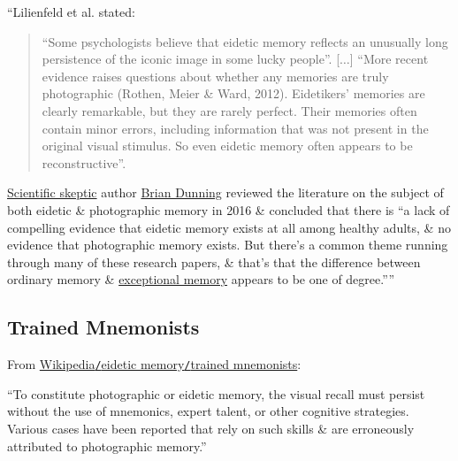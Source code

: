 \documentclass[oneside]{book}
\numberwithin{equation}{section}
\begin{document}
``Lilienfeld et al. stated:
\begin{quotation}
	``Some psychologists believe that eidetic memory reflects an unusually long persistence of the iconic image in some lucky people''. [$\ldots$] ``More recent evidence raises questions about whether any memories are truly photographic (Rothen, Meier \& Ward, 2012). Eidetikers' memories are clearly remarkable, but they are rarely perfect. Their memories often contain minor errors, including information that was not present in the original visual stimulus. So even eidetic memory often appears to be reconstructive''.
\end{quotation}
\href{https://en.wikipedia.org/wiki/Skeptical_movement}{Scientific skeptic} author \href{https://en.wikipedia.org/wiki/Brian_Dunning_(author)}{Brian Dunning} reviewed the literature on the subject of both eidetic \& photographic memory in 2016 \& concluded that there is ``a lack of compelling evidence that eidetic memory exists at all among healthy adults, \& no evidence that photographic memory exists. But there's a common theme running through many of these research papers, \& that's that the difference between ordinary memory \& \href{https://en.wikipedia.org/wiki/Exceptional_memory}{exceptional memory} appears to be one of degree.''''

\subsection{Trained Mnemonists}
From \href{https://en.wikipedia.org/wiki/Eidetic_memory#Trained_mnemonists}{Wikipedia\texttt{/}eidetic memory\texttt{/}trained mnemonists}:

``To constitute photographic or eidetic memory, the visual recall must persist without the use of mnemonics, expert talent, or other cognitive strategies. Various cases have been reported that rely on such skills \& are erroneously attributed to photographic memory.''
\end{document}
